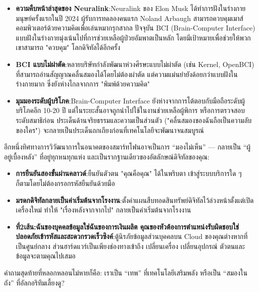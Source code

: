 \begin{itemize}
  \item \textbf{ความคืบหน้าล่าสุดของ Neuralink}:Neuralink ของ Elon Musk ได้ทำการฝังในร่างกายมนุษย์ครั้งแรกในปี 2024 ผู้รับการทดลองคนแรก Noland Arbaugh สามารถควบคุมเมาส์คอมพิวเตอร์ด้วยความคิดเพื่อเล่นหมากรุกสากล ปัจจุบัน BCI (Brain-Computer Interface) แบบฝังในร่างกายมุ่งเน้นไปที่การช่วยเหลือผู้ป่วยอัมพาตเป็นหลัก โดยมีเป้าหมายเพื่อช่วยให้พวกเขาสามารถ "ควบคุม" โลกดิจิทัลได้อีกครั้ง
  \item \textbf{BCI แบบไม่ผ่าตัด}:หลายบริษัทกำลังพัฒนาห่วงศีรษะแบบไม่ผ่าตัด (เช่น Kernel, OpenBCI) ที่สามารถอ่านสัญญาณคลื่นสมองได้โดยไม่ต้องผ่าตัด แต่ความแม่นยำยังด้อยกว่าแบบฝังในร่างกายมาก ซึ่งยังห่างไกลจากการ "พิมพ์ด้วยความคิด"
  \item \textbf{มุมมองระดับผู้บริโภค}:Brain-Computer Interface ยังห่างจากการโต้ตอบกับมือถือระดับผู้บริโภคอีก 10-20 ปี แต่ในระยะสั้นอาจถูกนำไปใช้ในงานช่วยเหลือผู้พิการ หรือการตรวจสอบระดับสมาธิก่อน ประเด็นด้านจริยธรรมและความเป็นส่วนตัว ("คลื่นสมองของฉันถือเป็นความลับของใคร") จะกลายเป็นประเด็นถกเถียงก่อนที่เทคโนโลยีจะพัฒนาจนสมบูรณ์
\end{itemize}


อีกหนึ่งทิศทางการวิวัฒนาการในอนาคตของสมาร์ทโฟนอาจเป็นการ “มองไม่เห็น” — กลายเป็น “ผู้อยู่เบื้องหลัง” ที่อยู่ทุกหนทุกแห่ง และเป็นรากฐานเดียวของอัตลักษณ์ดิจิทัลของคุณ:

\begin{itemize}
  \item \textbf{การยืนยันสองขั้นผ่านคลาวด์}:ยืนยันตัวตน "คุณคือคุณ" ได้ในพริบตา เข้าสู่ระบบบริการใด ๆ ก็ตามโดยไม่ต้องกรอกรหัสยืนยันด้วยมือ
  \item \textbf{มรดกดิจิทัลกลายเป็นค่าเริ่มต้นจากโรงงาน}:ตั้งค่าแผนสืบทอดสินทรัพย์ดิจิทัลไว้ล่วงหน้าตั้งแต่เปิดเครื่องใหม่ ทำให้ "เรื่องหลังจากจากไป" กลายเป็นค่าเริ่มต้นจากโรงงาน
  \item \textbf{ที่2เส้น:ฉันของบุคคลข้อมูลใช่ฉันของการเงินผลิต คุณของหัวต้องการตำแหน่งรับผิดชอบใช่ปลอดภัยเข้ารหัสและสะดวกรวดเร็วซิงค์}:ตู้นิรภัยข้อมูลส่วนบุคคลบน Cloud ของคุณต่างหากที่เป็นศูนย์กลาง ส่วนฮาร์ดแวร์เป็นเพียงช่องทางเข้าถึง เปลี่ยนเครื่อง เปลี่ยนอุปกรณ์ ตัวตนและข้อมูลจะตามคุณไปเสมอ
\end{itemize}


คำถามสุดท้ายที่หลอกหลอนไม่หายก็คือ: เราเป็น “เทพ” ที่เทคโนโลยีเสริมพลัง หรือเป็น “สมองในถัง” ที่อัลกอริทึมเลี้ยงดู?


